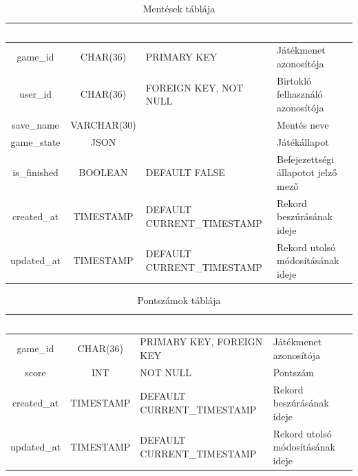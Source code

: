 \documentclass[12pt]{report}
\begin{document}
\begin{table}[h!]
    \centering
    \renewcommand{\arraystretch}{1.5}  %
    \begin{tabularx}{\textwidth}{|c|c|>{\raggedright\arraybackslash}X|>{\raggedright\arraybackslash}X|}  %
        \hline
        \rowcolor{gray!30} \textcolor{white}{\textbf{Mező}} & \textcolor{white}{\textbf{Típus}} & \textcolor{white}{\textbf{Korlátok}} & \textcolor{white}{\textbf{Leírás}} \\
        \hline
        game\_id & CHAR(36) & PRIMARY KEY & Játékmenet azonosítója \\
        \hline
        user\_id & CHAR(36) & FOREIGN KEY, NOT NULL & Birtokló felhasználó azonosítója \\
        \hline
        save\_name & VARCHAR(30) & & Mentés neve\\
        \hline
        game\_state & JSON & & Játékállapot \\
        \hline
        is\_finished & BOOLEAN & DEFAULT FALSE & Befejezettségi állapotot jelző mező \\
        \hline
        created\_at & TIMESTAMP & DEFAULT CURRENT\_TIMESTAMP & Rekord beszúrásának ideje \\
        \hline
        updated\_at & TIMESTAMP & DEFAULT CURRENT\_TIMESTAMP & Rekord utolsó módosításának ideje \\
        \hline
    \end{tabularx}
    \caption{Mentések táblája}
    \label{tab:saves}
\end{table}

\begin{table}[h!]
    \centering
    \renewcommand{\arraystretch}{1.5}  %
    \begin{tabularx}{\textwidth}{|c|c|>{\raggedright\arraybackslash}X|>{\raggedright\arraybackslash}X|}  %
        \hline
        \rowcolor{gray!30} \textcolor{white}{\textbf{Mező}} & \textcolor{white}{\textbf{Típus}} & \textcolor{white}{\textbf{Korlátok}} & \textcolor{white}{\textbf{Leírás}} \\
        \hline
        game\_id & CHAR(36) & PRIMARY KEY, FOREIGN KEY & Játékmenet azonosítója \\
        \hline
        score & INT & NOT NULL & Pontszám \\
        \hline
        created\_at & TIMESTAMP & DEFAULT CURRENT\_TIMESTAMP & Rekord beszúrásának ideje \\
        \hline
        updated\_at & TIMESTAMP & DEFAULT CURRENT\_TIMESTAMP & Rekord utolsó módosításának ideje \\
        \hline
    \end{tabularx}
    \caption{Pontszámok táblája}
    \label{tab:scores}
\end{table}
\end{document}
